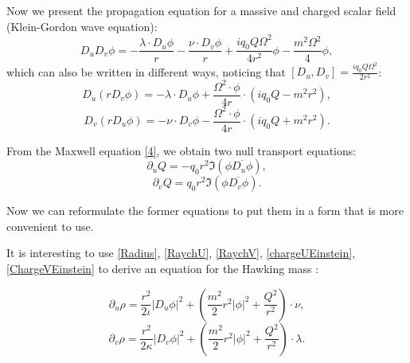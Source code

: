 \documentclass[10pt,a4paper]{article}
\theoremstyle{plain}
\theoremstyle{remark}
\theoremstyle{definition}
\theoremstyle{plain}
\theoremstyle{remark}
\theoremstyle{definition}
\numberwithin{equation}{section}
\begin{document}
Now we present the propagation equation for a massive and charged scalar field  (Klein-Gordon wave equation):
\begin{equation}\label{Field}
D_{u} D_{v} \phi =-\frac{ \lambda \cdot D_{u}\phi}{r}-\frac{ \nu \cdot  D_{v}\phi}{r} +\frac{ iq_{0} Q \Omega^{2}}{4r^{2}} \phi
-\frac{ m^{2}\Omega^{2}}{4}\phi,\end{equation}which can also be written in different ways, noticing that $[D_u,D_v]=\frac{ iq_{0} Q \Omega^{2}}{2r^{2}}$:	\begin{equation}\label{Field2}
D_{u}(rD_{v} \phi) =- \lambda \cdot D_u\phi +\frac{ \Omega^{2} \cdot \phi}{4r} \cdot ( i q_{0} Q-m^2 r^2)
, \end{equation}\begin{equation}\label{Field3}
D_{v}(rD_{u} \phi) = - \nu  \cdot D_{v}\phi 
- \frac{ \Omega^{2} \cdot \phi}{4r} \cdot ( i q_{0} Q+m^2 r^2)
. \end{equation}

From the Maxwell equation \eqref{4}, we obtain two null transport equations:
\begin{equation} \label{chargeUEinstein}
\partial_u Q = -q_0 r^2 \Im( \phi \overline{ D_u \phi}),
\end{equation}	\begin{equation} \label{ChargeVEinstein}
\partial_v Q = q_0 r^2 \Im( \phi \overline{D_v \phi}) .
\end{equation}











Now we can reformulate the former equations to put them in a form that is more convenient to use. 

It is interesting to use \eqref{Radius}, \eqref{RaychU}, \eqref{RaychV}, \eqref{chargeUEinstein}, \eqref{ChargeVEinstein} to derive an equation for the Hawking mass : 



\begin{equation} \label{massUEinstein}
\partial_u \rho = \frac{r^2}{2\iota}| D_u \phi |^2 +  \left(\frac{m^2}{2} r^2 |\phi|^2+ \frac{Q^2}{r^2} \right) \cdot \nu  ,
\end{equation}
\begin{equation} \label{massVEinstein} 
\partial_v \rho = \frac{r^2}{2\kappa}| D_v \phi |^2+ \left(\frac{m^2}{2} r^2 |\phi|^2+ \frac{Q^2}{r^2} \right) \cdot \lambda.
\end{equation}
\end{document}
